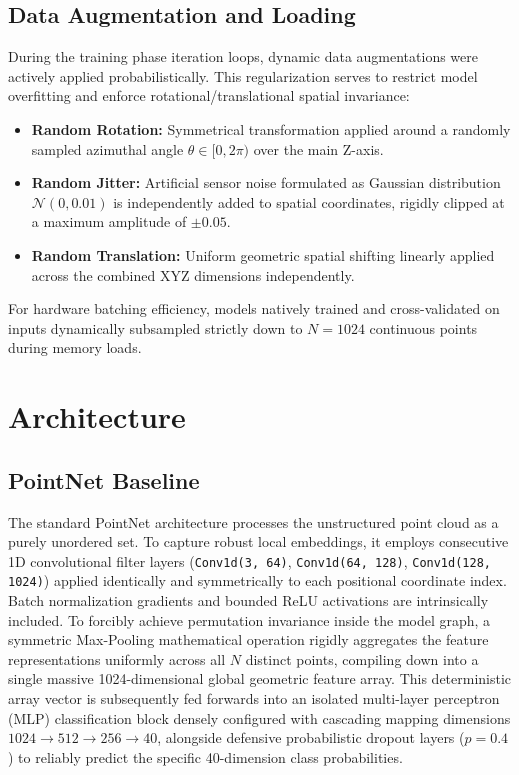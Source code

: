 \documentclass{article}
\begin{document}
\subsection{Data Augmentation and Loading}
During the training phase iteration loops, dynamic data augmentations were actively applied probabilistically. This regularization serves to restrict model overfitting and enforce rotational/translational spatial invariance:
\begin{itemize}
    \item \textbf{Random Rotation:} Symmetrical transformation applied around a randomly sampled azimuthal angle $ \theta \in [0, 2\pi) $ over the main Z-axis.
    \item \textbf{Random Jitter:} Artificial sensor noise formulated as Gaussian distribution $ \mathcal{N}(0, 0.01) $ is independently added to spatial coordinates, rigidly clipped at a maximum amplitude of $\pm0.05$.
    \item \textbf{Random Translation:} Uniform geometric spatial shifting linearly applied across the combined XYZ dimensions independently.
\end{itemize}
For hardware batching efficiency, models natively trained and cross-validated on inputs dynamically subsampled strictly down to $N=1024$ continuous points during memory loads.

\section{Architecture}

\subsection{PointNet Baseline}
The standard PointNet architecture processes the unstructured point cloud as a purely unordered set. To capture robust local embeddings, it employs consecutive 1D convolutional filter layers (\texttt{Conv1d(3, 64)}, \texttt{Conv1d(64, 128)}, \texttt{Conv1d(128, 1024)}) applied identically and symmetrically to each positional coordinate index. Batch normalization gradients and bounded ReLU activations are intrinsically included.
To forcibly achieve permutation invariance inside the model graph, a symmetric Max-Pooling mathematical operation rigidly aggregates the feature representations uniformly across all $N$ distinct points, compiling down into a single massive 1024-dimensional global geometric feature array. This deterministic array vector is subsequently fed forwards into an isolated multi-layer perceptron (MLP) classification block densely configured with cascading mapping dimensions $1024 \rightarrow 512 \rightarrow 256 \rightarrow 40$, alongside defensive probabilistic dropout layers ($p=0.4$) to reliably predict the specific 40-dimension class probabilities.
\end{document}
